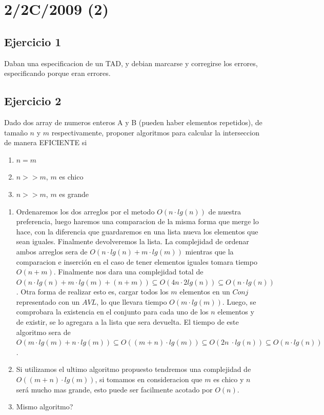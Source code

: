 \documentclass[10pt, a4paper]{report}
\begin{document}
\newpage
\section{2/2C/2009 (2)}

\subsection*{Ejercicio 1}

Daban una especificacion de un TAD, y debian marcarse y corregirse los errores, especificando porque eran errores.

\subsection*{Ejercicio 2}

Dado dos array de numeros enteros A y B (pueden haber elementos repetidos), de tama\~no $n$ y $m$ respectivamente, proponer algoritmos para calcular la interseccion de manera EFICIENTE si

\begin{enumerate}
 \item $n = m$
 \item $n >> m$, $m$ es chico
 \item $n >> m$, $m$ es grande
\end{enumerate}

\begin{enumerate}
 \item Ordenaremos los dos arreglos por el metodo $O(n\cdot lg(n))$ de nuestra preferencia, luego haremos una comparacion de la misma forma que merge lo hace, con la diferencia que guardaremos en una lista nueva los elementos que sean iguales. Finalmente devolveremos la lista. La complejidad de ordenar ambos arreglos sera de $O(n\cdot lg(n) + m \cdot lg(m))$ mientras que la comparacion e inserci\'on en el caso de tener elementos iguales tomara tiempo $O(n+m)$. Finalmente nos dara una complejidad total de $O(n\cdot lg(n) + m \cdot lg(m) + (n+m)) \subseteq O(4n \cdot 2lg(n)) \subseteq O(n \cdot lg(n))$. Otra forma de realizar esto es, cargar todos los $m$ elementos en un $Conj$ representado con un $AVL$, lo que llevara tiempo $O(m \cdot lg(m))$. Luego, se comprobara la existencia en el conjunto para cada uno de los $n$ elementos y de existir, se lo agregara a la lista que sera devuelta. El tiempo de este algoritmo sera de $O(m\cdot lg(m) + n \cdot lg(m)) \subseteq O((m+n) \cdot lg(m)) \subseteq O(2n \
\cdot lg(n)) \subseteq O(n \cdot lg(n))$.
 \item Si utilizamos el ultimo algoritmo propuesto tendremos una complejidad de $O((m+n) \cdot lg(m))$, si tomamos en consideracion que $m$ es chico y $n$ ser\'a mucho mas grande, esto puede ser facilmente acotado por $O(n)$. 

 \item {\color{red}Mismo algoritmo?}
\end{enumerate}
\end{document}
